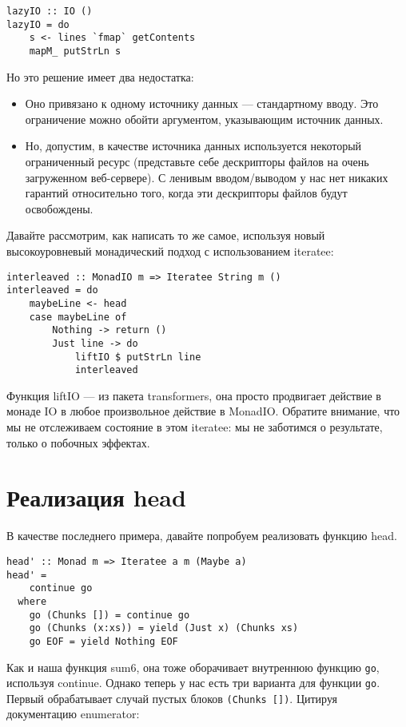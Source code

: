 \begin{lstlisting}
lazyIO :: IO ()
lazyIO = do
    s <- lines `fmap` getContents
    mapM_ putStrLn s
\end{lstlisting}

Но это решение имеет два недостатка:

\begin{itemize}
\item Оно привязано к одному источнику данных --- стандартному вводу. Это ограничение можно обойти аргументом, указывающим источник данных.
\item Но, допустим, в качестве источника данных используется некоторый ограниченный ресурс (представьте себе дескрипторы файлов на очень загруженном веб-сервере). С ленивым вводом/выводом у нас нет никаких гарантий относительно того, когда эти дескрипторы файлов будут освобождены.
\end{itemize}

Давайте рассмотрим, как написать то же самое, используя новый высокоуровневый монадический подход с использованием iteratee:

\begin{lstlisting}
interleaved :: MonadIO m => Iteratee String m ()
interleaved = do
    maybeLine <- head
    case maybeLine of
        Nothing -> return ()
        Just line -> do
            liftIO $ putStrLn line
            interleaved
\end{lstlisting}%

Функция liftIO --- из пакета transformers, она просто продвигает действие в монаде IO в любое произвольное действие в MonadIO. Обратите внимание, что мы не отслеживаем состояние в этом iteratee: мы не заботимся о результате, только о побочных эффектах.

\section{Реализация head}

В качестве последнего примера, давайте попробуем реализовать функцию head.

\begin{lstlisting}
head' :: Monad m => Iteratee a m (Maybe a)
head' =
    continue go
  where
    go (Chunks []) = continue go
    go (Chunks (x:xs)) = yield (Just x) (Chunks xs)
    go EOF = yield Nothing EOF
\end{lstlisting}

Как и наша функция sum6, она тоже оборачивает внутреннюю функцию \lstinline'go', используя continue. Однако теперь у нас есть три варианта для функции \lstinline'go'. Первый обрабатывает случай пустых блоков \lstinline'(Chunks [])'. Цитируя документацию enumerator:

